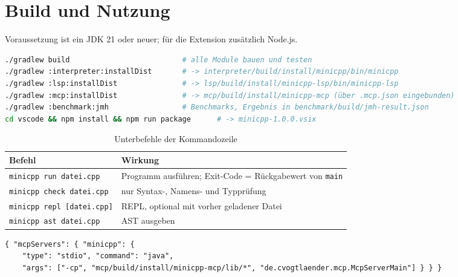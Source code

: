 \documentclass[11pt,a4paper,parskip=half,headsepline,toc=flat]{scrartcl}
\newcommand{\code}[1]{\texttt{#1}}
\newcommand{\thead}{\rowcolor{headbg}}
\newcommand{\hcell}[1]{\textbf{\color{navy}#1}}
\newenvironment{reporttable}[1][]%
  {\begin{table}[htbp]\centering\small\renewcommand{\arraystretch}{1.25}\rowcolors{2}{white}{zebra}}%
  {\end{table}}
\begin{document}
\clearpage
\appendix
\section{Build und Nutzung}\label{app:build}
Voraussetzung ist ein JDK 21 oder neuer; für die Extension zusätzlich Node.js.

\begin{lstlisting}[language=bash,caption={Build-Befehle}]
./gradlew build                          # alle Module bauen und testen
./gradlew :interpreter:installDist       # -> interpreter/build/install/minicpp/bin/minicpp
./gradlew :lsp:installDist               # -> lsp/build/install/minicpp-lsp/bin/minicpp-lsp
./gradlew :mcp:installDist               # -> mcp/build/install/minicpp-mcp (über .mcp.json eingebunden)
./gradlew :benchmark:jmh                 # Benchmarks, Ergebnis in benchmark/build/jmh-result.json
cd vscode && npm install && npm run package      # -> minicpp-1.0.0.vsix
\end{lstlisting}

\begin{reporttable}
\begin{tabular}{L{0.33}L{0.59}}
\thead \hcell{Befehl} & \hcell{Wirkung} \\ \midrule
\code{minicpp run datei.cpp} & Programm ausführen; Exit-Code = Rückgabewert von \code{main} \\
\code{minicpp check datei.cpp} & nur Syntax-, Namens- und Typprüfung \\
\code{minicpp repl [datei.cpp]} & REPL, optional mit vorher geladener Datei \\
\code{minicpp ast datei.cpp} & AST ausgeben \\ \bottomrule
\end{tabular}
\caption{Unterbefehle der Kommandozeile}
\end{reporttable}

\begin{lstlisting}[caption={Registrierung des MCP-Servers in \code{.mcp.json}}]
{ "mcpServers": { "minicpp": {
    "type": "stdio", "command": "java",
    "args": ["-cp", "mcp/build/install/minicpp-mcp/lib/*", "de.cvogtlaender.mcp.McpServerMain"] } } }
\end{lstlisting}
\end{document}
